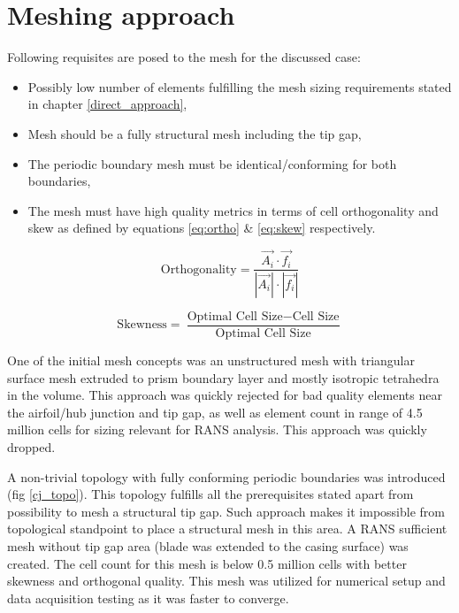 \section{Meshing approach} \label{mesh}
Following requisites are posed to the mesh for the discussed case:
\begin{itemize}
\item Possibly low number of elements fulfilling the mesh sizing requirements stated in chapter \ref{direct_approach},
\item Mesh should be a fully structural mesh including the tip gap,
\item The periodic boundary mesh must be identical/conforming for both boundaries,
\item The mesh must have high quality metrics in terms of cell orthogonality and skew as defined by equations \ref{eq:ortho} \& \ref{eq:skew} respectively.
\end{itemize}


\begin{equation} \label{eq:ortho}
\text{Orthogonality} = \frac{\vec{A_i} \cdot \vec{f_i}}{|\vec{A_i}| \cdot |\vec{f_i}|}
\end{equation}


\begin{equation} \label{eq:skew}
\text{Skewness} = \frac{\text{Optimal Cell Size} - \text{Cell Size}}{\text{Optimal Cell Size}}
\end{equation}


One of the initial mesh concepts was an unstructured mesh with triangular surface mesh extruded to prism boundary layer and mostly isotropic tetrahedra in the volume. This approach was quickly rejected for bad quality elements near the airfoil/hub junction and tip gap, as well as element count in range of 4.5 million cells for sizing relevant for RANS analysis. This approach was quickly dropped.

A non-trivial topology with fully conforming periodic boundaries was introduced (fig \ref{cj_topo}). This topology fulfills all the prerequisites stated apart from possibility to mesh a structural tip gap. Such approach makes it impossible from topological standpoint to place a structural mesh in this area. A RANS sufficient mesh without tip gap area (blade was extended to the casing surface) was created. The cell count for this mesh is below 0.5 million cells with better skewness and orthogonal quality. This mesh was utilized for numerical setup and data acquisition testing as it was faster to converge.

